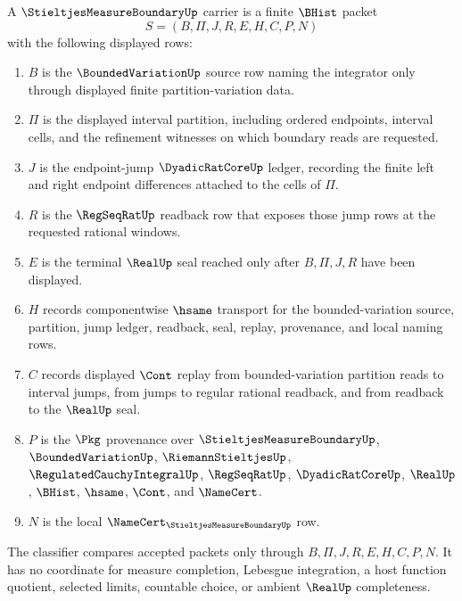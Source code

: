 \begin{definition}
\label{def:stieltjes-measure-boundary-carrier}
A $\StieltjesMeasureBoundaryUp$ carrier is a finite $\BHist$ packet
$$
S=(B,\Pi,J,R,E,H,C,P,N)
$$
with the following displayed rows:
\begin{enumerate}
\item $B$ is the $\BoundedVariationUp$ source row naming the integrator only through displayed finite partition-variation data.
\item $\Pi$ is the displayed interval partition, including ordered endpoints, interval cells, and the refinement witnesses on which boundary reads are requested.
\item $J$ is the endpoint-jump $\DyadicRatCoreUp$ ledger, recording the finite left and right endpoint differences attached to the cells of $\Pi$.
\item $R$ is the $\RegSeqRatUp$ readback row that exposes those jump rows at the requested rational windows.
\item $E$ is the terminal $\RealUp$ seal reached only after $B,\Pi,J,R$ have been displayed.
\item $H$ records componentwise $\hsame$ transport for the bounded-variation source, partition, jump ledger, readback, seal, replay, provenance, and local naming rows.
\item $C$ records displayed $\Cont$ replay from bounded-variation partition reads to interval jumps, from jumps to regular rational readback, and from readback to the $\RealUp$ seal.
\item $P$ is the $\Pkg$ provenance over $\StieltjesMeasureBoundaryUp$, $\BoundedVariationUp$, $\RiemannStieltjesUp$, $\RegulatedCauchyIntegralUp$, $\RegSeqRatUp$, $\DyadicRatCoreUp$, $\RealUp$, $\BHist$, $\hsame$, $\Cont$, and $\NameCert$.
\item $N$ is the local $\NameCert_{\StieltjesMeasureBoundaryUp}$ row.
\end{enumerate}
The classifier compares accepted packets only through $B,\Pi,J,R,E,H,C,P,N$. It has no coordinate for measure completion, Lebesgue integration, a host function quotient, selected limits, countable choice, or ambient $\RealUp$ completeness.
\end{definition}

